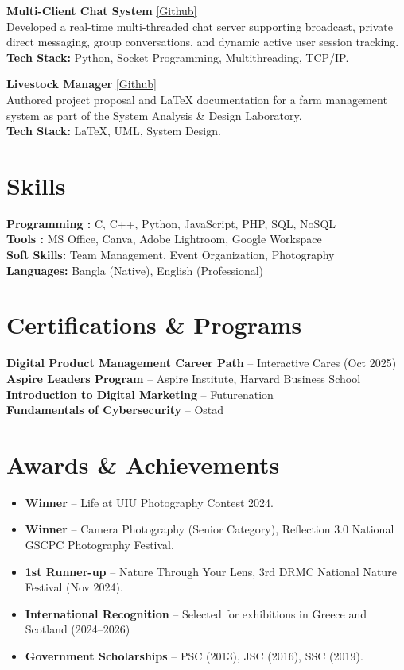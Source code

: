 \documentclass[10pt,a4paper]{article}
\begin{document}
\textbf{Multi-Client Chat System} \hfill \href{https://github.com/mdzobaerahmed/Computer-Networks-Socket-Programming}{[Github]}\\
Developed a real-time multi-threaded chat server supporting broadcast, private direct messaging, group conversations, and dynamic active user session tracking.\\
\textbf{Tech Stack:} Python, Socket Programming, Multithreading, TCP/IP.
\vspace{2mm}

\textbf{Livestock Manager} \hfill \href{https://github.com/mdzobaerahmed}{[Github]}\\
Authored project proposal and LaTeX documentation for a farm management system as part of the System Analysis \& Design Laboratory.\\
\textbf{Tech Stack:} LaTeX, UML, System Design.

\section*{Skills}
\textbf{Programming :} C, C++, Python, JavaScript, PHP, SQL, NoSQL\\
\textbf{Tools :} MS Office, Canva, Adobe Lightroom, Google Workspace \\
\textbf{Soft Skills:} Team Management, Event Organization, Photography \\
\textbf{Languages:} Bangla (Native), English (Professional)

\section*{Certifications \& Programs}
\textbf{Digital Product Management Career Path} -- Interactive Cares (Oct 2025) \\
\textbf{Aspire Leaders Program} -- Aspire Institute, Harvard Business School \\
\textbf{Introduction to Digital Marketing} -- Futurenation \\
\textbf{Fundamentals of Cybersecurity} -- Ostad

\section*{Awards \& Achievements}
\begin{itemize}
    \item \textbf{Winner} -- Life at UIU Photography Contest 2024.
    \item \textbf{Winner} -- Camera Photography (Senior Category), Reflection 3.0 National GSCPC Photography Festival.
    \item \textbf{1st Runner-up} -- Nature Through Your Lens, 3rd DRMC National Nature Festival (Nov 2024).
    \item \textbf{International Recognition} -- Selected for exhibitions in Greece and Scotland (2024--2026)
    \item \textbf{Government Scholarships} -- PSC (2013), JSC (2016), SSC (2019).
\end{itemize}
\end{document}
